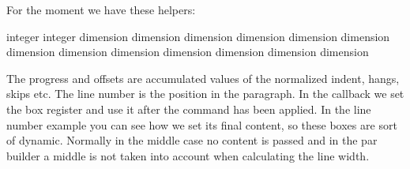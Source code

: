 \typebuffer[example][option=TEX]

{\getbuffer[example]}

\stopsectionlevel

\startsectionlevel[title=The helpers]

For the moment we have these helpers:

\starttabulate[|l|;|]
\NC \type {\localboxindex}            \NC integer   \NC \NR
\NC \type {\localboxlinenumber}       \NC integer   \NC \NR
\NC
\NC \type {\localboxlinewidth}        \NC dimension \NC \NR
\NC \type {\localboxlocalwidth}       \NC dimension \NC \NR
\NC \type {\localboxprogress}         \NC dimension \NC \NR
\NC \type {\localboxleftoffset}       \NC dimension \NC \NR
\NC \type {\localboxrightoffset}      \NC dimension \NC \NR
\NC
\NC \type {\localboxleftskip}         \NC dimension \NC \NR
\NC \type {\localboxrightskip}        \NC dimension \NC \NR
\NC \type {\localboxlefthang}         \NC dimension \NC \NR
\NC \type {\localboxrighthang}        \NC dimension \NC \NR
\NC
\NC \type {\localboxindent}           \NC dimension \NC \NR
\NC \type {\localboxparfillleftskip}  \NC dimension \NC \NR
\NC \type {\localboxparfillrightskip} \NC dimension \NC \NR
\NC \type {\localboxovershoot}        \NC dimension \NC \NR
\NC
\stoptabulate

The progress and offsets are accumulated values of the normalized indent, hangs,
skips etc. The line number is the position in the paragraph. In the callback we
set the box register \type {\localboxcontentbox} and use it after the command has
been applied. In the line number example you can see how we set its final
content, so these boxes are sort of dynamic. Normally in the middle case no
content is passed and in the par builder a middle is not taken into account when
calculating the line width.

\stopsectionlevel

\stopdocument


